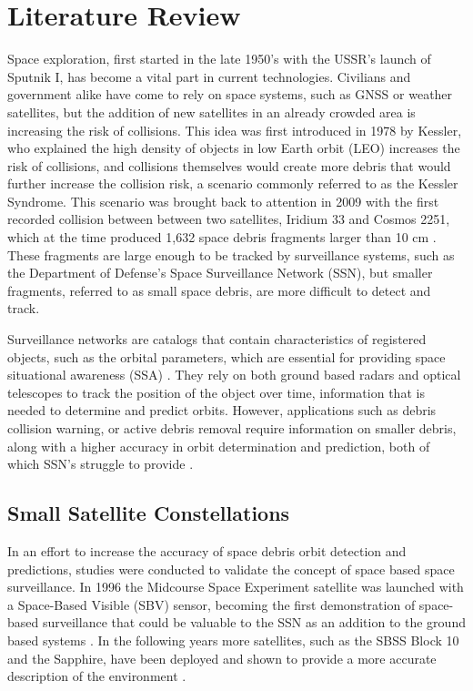 \documentclass[conference]{IEEEtran}
\begin{document}
	\section{Literature Review}

		Space exploration, first started in the late 1950's with the USSR's launch of Sputnik I, has become a vital part in current technologies.
		Civilians and government alike have come to rely on space systems, such as GNSS or weather satellites, but the addition of new satellites in an already crowded area is increasing the risk of collisions. 
		This idea was first introduced in 1978 by Kessler, who explained the high density of objects in low Earth orbit (LEO) increases the risk of collisions, and collisions themselves would create more debris that would further increase the collision risk, a scenario commonly referred to as the Kessler Syndrome.
		This scenario was brought back to attention in 2009 with the first recorded collision between between two satellites, Iridium 33 and Cosmos 2251, which at the time produced 1,632 space debris fragments larger than 10 cm \cite{Wang2010AnalysisOD}. These fragments are large enough to be tracked by surveillance systems, such as the Department of Defense’s Space Surveillance Network (SSN), but smaller fragments, referred to as small space debris, are more difficult to detect and track. 
		
		Surveillance networks are catalogs that contain characteristics of registered objects, such as the orbital parameters, which are essential for providing space situational awareness (SSA) \cite{2019_lidar}.
		They rely on both ground based radars and optical telescopes to track the position of the object over time, information that is needed to determine and predict orbits.
		However, applications such as debris collision warning, or active debris removal require information on smaller debris, along with a higher accuracy in orbit determination and prediction, both of which SSN's struggle to provide \cite{2020_ml_approach}.
		

	\subsection{Small Satellite Constellations}
		In an effort to increase the accuracy of space debris orbit detection and predictions, studies were conducted to validate the concept of space based space surveillance. In 1996 the Midcourse Space Experiment satellite was launched with a Space-Based Visible (SBV) sensor, becoming the first demonstration of space-based surveillance that could be valuable to the SSN as an addition to the ground based systems \cite{stokes2000space}. In the following years more satellites, such as the SBSS Block 10 and the Sapphire, have been deployed and shown to provide a more accurate description of the environment  \cite{multi_spacecraft_2016}. 
\end{document}
